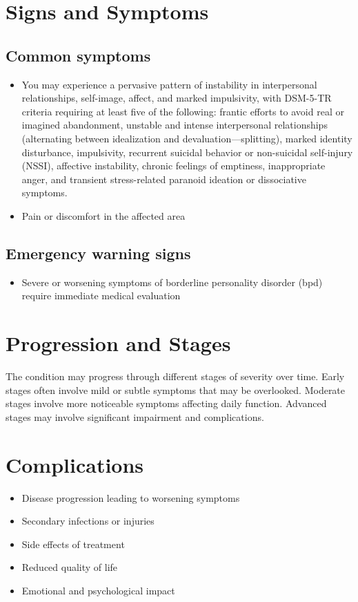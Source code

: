 \section{Signs and Symptoms}
\subsection{Common symptoms}
\begin{itemize}[noitemsep]
  \item You may experience a pervasive pattern of instability in interpersonal relationships, self-image, affect, and marked impulsivity, with DSM-5-TR criteria requiring at least five of the following: frantic efforts to avoid real or imagined abandonment, unstable and intense interpersonal relationships (alternating between idealization and devaluation---splitting), marked identity disturbance, impulsivity, recurrent suicidal behavior or non-suicidal self-injury (NSSI), affective instability, chronic feelings of emptiness, inappropriate anger, and transient stress-related paranoid ideation or dissociative symptoms.
  \item Pain or discomfort in the affected area
  \end{itemize}
\subsection{Emergency warning signs}
\begin{itemize}[noitemsep]
  \item Severe or worsening symptoms of borderline personality disorder (bpd) require immediate medical evaluation
\end{itemize}
\section{Progression and Stages}
The condition may progress through different stages of severity over time. Early stages often involve mild or subtle symptoms that may be overlooked. Moderate stages involve more noticeable symptoms affecting daily function. Advanced stages may involve significant impairment and complications.
\section{Complications}
\begin{itemize}[noitemsep]
  \item Disease progression leading to worsening symptoms
  \item Secondary infections or injuries
  \item Side effects of treatment
  \item Reduced quality of life
  \item Emotional and psychological impact
\end{itemize}
